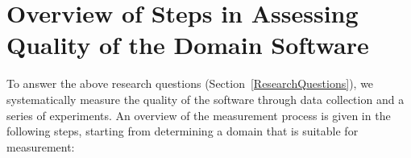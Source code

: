 \documentclass[letterpaper,cleveref]{lipics-v2019}
\theoremstyle{definition}
\begin{document}
%
%
%
%
%

\section{Overview of Steps in Assessing Quality of the Domain Software} \label{StepsAQDS}

To answer the above research questions (Section~\ref{ResearchQuestions}), we
systematically measure the quality of the software through data collection and a
series of experiments.  An overview of the measurement process is given in the
following steps, starting from determining a domain that is suitable for
measurement:
\end{document}
